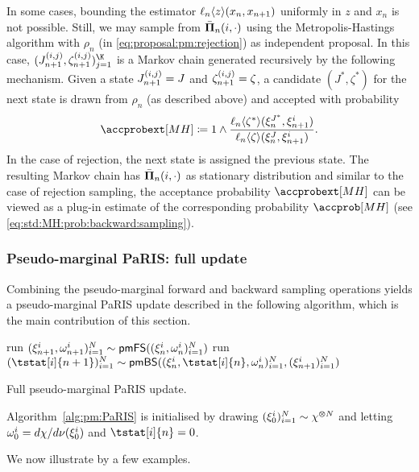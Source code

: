 In some cases, bounding the estimator $\ell_{n} \langle z \rangle(x_n, x_{n + 1})$ uniformly in $z$ and $x_n$ is not possible. Still, we may sample from $\bar{\boldsymbol{\Pi}}_{n}(i, \cdot)$ using the Metropolis-Hastings algorithm with $\rho_n$ (in \eqref{eq:proposal:pm:rejection}) as independent proposal. In this case, $(\bi{n + 1}{i}{j}, \zpart{n + 1}{(i, j)})_{j = 1}^{\K}$ is a Markov chain generated recursively by the following mechanism. Given a state $J_{n + 1}^{(i, j)} = J$ and $\zeta_{n + 1}^{(i, j)} = \zeta$, a candidate $(J^\ast, \zeta^\ast)$ for the next state is drawn from $\rho_n$ (as described above) and accepted with probability 
$$
\accprobext[MH] \eqdef 1 \wedge \frac{\ukest{n}{\zeta^\ast}(\epart{n}{J^\ast}, \epart{n + 1}{i})}{\ukest{n}{\zeta}(\epart{n}{J}, \epart{n + 1}{i})}. 
$$  
In the case of rejection, the next state is assigned the previous state. The resulting Markov chain has $\bar{\boldsymbol{\Pi}}_{n}(i, \cdot)$ as stationary distribution and similar to the case of rejection sampling, the acceptance probability $\accprobext[MH]$ can be viewed as a plug-in estimate of the corresponding probability $\accprob[MH]$ (see \eqref{eq:std:MH:prob:backward:sampling}). 

\subsubsection{Pseudo-marginal PaRIS: full update} 

Combining the pseudo-marginal forward and backward sampling operations yields a pseudo-marginal PaRIS update described in the following algorithm, which is the main contribution of this section.  

\begin{algorithm}[h] 
    run $(\xi_{n + 1}^{i}, \omega_{n + 1}^{i})_{i = 1}^N \sim \mathsf{pmFS}((\xi_{n}^{i}, \omega_{n}^{i})_{i = 1}^N)$\;
    run $(\tstat[i]{n + 1})_{i = 1}^\N \sim \mathsf{pmBS}((\epart{n}{i}, \tstat[i]{n}, \ewght{n}{i})_{i = 1}^\N, (\epart{n + 1}{i})_{i = 1}^\N)$\; 
    \medskip
\caption{Full pseudo-marginal PaRIS update.} \label{alg:pm:PaRIS}
\end{algorithm}

Algorithm~\ref{alg:pm:PaRIS} is initialised by drawing $(\xi_{0}^{i})_{i = 1}^N \sim \chi^{\varotimes N}$ and letting $\omega_{0}^{i} = d \chi / d \nu(\xi_{0}^{i})$ and $\tstat[i]{n} = 0$.

We now illustrate  by a few examples. 

